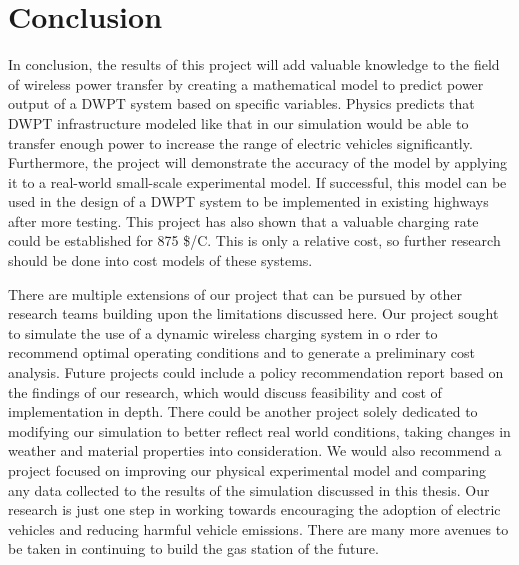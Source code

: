 
\renewcommand{\thechapter}{7}

\chapter{Conclusion}
In conclusion, the results of this project will add valuable knowledge to the field of wireless power transfer 
by creating a mathematical model to predict power output of a DWPT system based on specific variables. 
Physics predicts that DWPT infrastructure modeled like that in our simulation would be able to transfer enough 
power to increase the range of electric vehicles significantly. Furthermore, the project will demonstrate the 
accuracy of the model by applying it to a real-world small-scale experimental model.  If successful, this model 
can be used in the design of a DWPT system to be implemented in existing highways after more testing. This project 
has also shown that a valuable charging rate could be established for 875 \$/C.  This is only a relative cost, 
so further research should be done into cost models of these systems. 

There are multiple extensions of our project that can be pursued by other research teams building upon the 
limitations discussed here. Our project sought to simulate the use of a dynamic wireless charging system in o
rder to recommend optimal operating conditions and to generate a preliminary cost analysis. Future projects could 
include a policy recommendation report based on the findings of our research, which would discuss feasibility and 
cost of implementation in depth. There could be another project solely dedicated to modifying our simulation to 
better reflect real world conditions, taking changes in weather and material properties into consideration. We 
would also recommend a project focused on improving our physical experimental model and comparing any data collected 
to the results of the simulation discussed in this thesis. Our research is just one step in working towards 
encouraging the adoption of electric vehicles and reducing harmful vehicle emissions. There are many more avenues 
to be taken in continuing to build the gas station of the future.